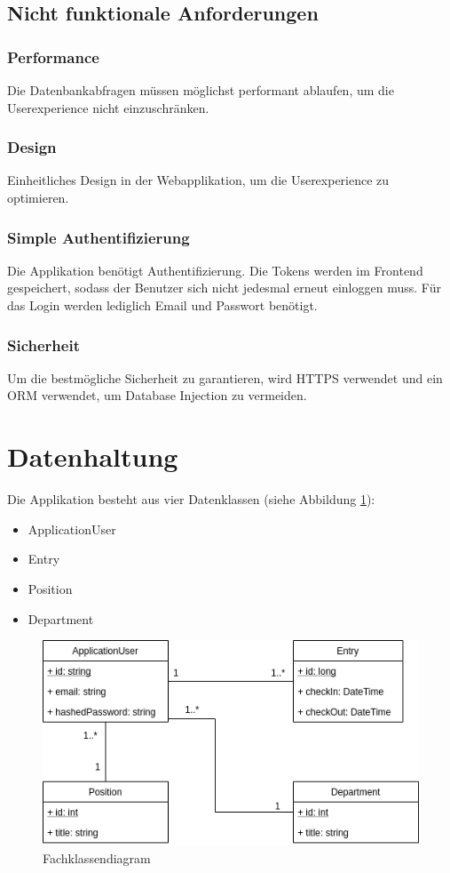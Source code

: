 \documentclass[a4paper, titlepage]{article}
\begin{document}
    \subsection{Nicht funktionale Anforderungen}
    \subsubsection{Performance}
    Die Datenbankabfragen müssen möglichst performant ablaufen, um die
    Userexperience nicht einzuschränken.
    \subsubsection{Design}
    Einheitliches Design in der Webapplikation, um die Userexperience zu
    optimieren.
    \subsubsection{Simple Authentifizierung}
    Die Applikation benötigt Authentifizierung. Die Tokens werden im
    Frontend gespeichert, sodass der Benutzer sich nicht jedesmal erneut
    einloggen muss. Für das Login werden lediglich Email und Passwort
    benötigt.
    \subsubsection{Sicherheit}
    Um die bestmögliche Sicherheit zu garantieren, wird HTTPS verwendet
    und ein ORM verwendet, um Database Injection zu vermeiden.

    \section{Datenhaltung}
    Die Applikation besteht aus vier Datenklassen (siehe Abbildung \ref{fachklassen}):
    \begin{itemize}
        \item ApplicationUser
        \item Entry
        \item Position
        \item Department
    \end{itemize}

    \begin{figure}
        \includegraphics[width=\textwidth]{images/Fachklassendiagramm.png}
        \caption{Fachklassendiagram}
        \label{fachklassen}
    \end{figure}
\end{document}
